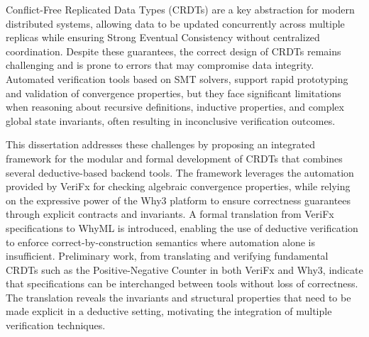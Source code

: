 
%

Conflict-Free Replicated Data Types (CRDTs) are a key abstraction for modern distributed systems, allowing data to be updated concurrently across multiple replicas while ensuring Strong Eventual Consistency without centralized coordination. Despite these guarantees, the correct design of CRDTs remains challenging and is prone to errors that may compromise data integrity. Automated verification tools based on SMT solvers, support rapid prototyping and validation of convergence properties, but they face significant limitations when reasoning about recursive definitions, inductive properties, and complex global state invariants, often resulting in inconclusive verification outcomes.

This dissertation addresses these challenges by proposing an integrated framework for the modular and formal development of CRDTs that combines several deductive-based backend tools. The framework leverages the automation provided by VeriFx for checking algebraic convergence properties, while relying on the expressive power of the Why3 platform to ensure correctness guarantees through explicit contracts and invariants. A formal translation from VeriFx specifications to WhyML is introduced, enabling the use of deductive verification to enforce correct-by-construction semantics where automation alone is insufficient. Preliminary work, from translating and verifying fundamental CRDTs such as the Positive-Negative Counter in both VeriFx and Why3, indicate that specifications can be interchanged between tools without loss of correctness. The translation reveals the invariants and structural properties that need to be made explicit in a deductive setting, motivating the integration of multiple verification techniques.

